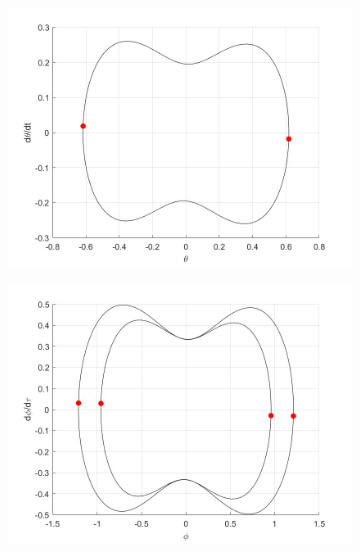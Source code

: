 \documentclass[12pt, letterpaper]{article}
\begin{document}
\begin{figure}[h]
    \centering
    \begin{subfigure}[b]{0.32\textwidth}
        \centering
        \includegraphics[width=\linewidth]{Bif_poincare_1_P2.jpg}
    \end{subfigure}
    \hfill
    \begin{subfigure}[b]{0.32\textwidth}
        \centering
        \includegraphics[width=\linewidth]{Bif_poincare_2_P2.jpg}
    \end{subfigure}
    \hfill
    \begin{subfigure}[b]{0.32\textwidth}
        \centering

\end{subfigure}
\end{figure}
\end{document}
